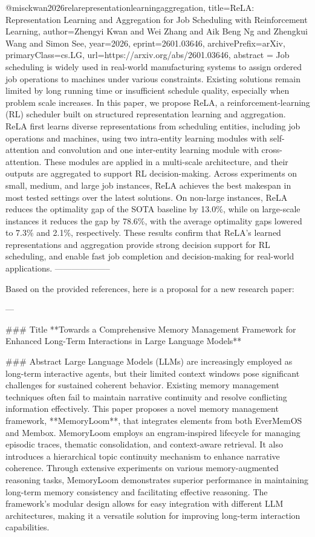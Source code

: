{}@misc{kwan2026relarepresentationlearningaggregation,
      title={ReLA: Representation Learning and Aggregation for Job Scheduling with Reinforcement Learning}, 
      author={Zhengyi Kwan and Wei Zhang and Aik Beng Ng and Zhengkui Wang and Simon See},
      year={2026},
      eprint={2601.03646},
      archivePrefix={arXiv},
      primaryClass={cs.LG},
      url={https://arxiv.org/abs/2601.03646},
      abstract = {Job scheduling is widely used in real-world manufacturing systems to assign ordered job operations to machines under various constraints. Existing solutions remain limited by long running time or insufficient schedule quality, especially when problem scale increases. In this paper, we propose ReLA, a reinforcement-learning (RL) scheduler built on structured representation learning and aggregation. ReLA first learns diverse representations from scheduling entities, including job operations and machines, using two intra-entity learning modules with self-attention and convolution and one inter-entity learning module with cross-attention. These modules are applied in a multi-scale architecture, and their outputs are aggregated to support RL decision-making. Across experiments on small, medium, and large job instances, ReLA achieves the best makespan in most tested settings over the latest solutions. On non-large instances, ReLA reduces the optimality gap of the SOTA baseline by 13.0\%, while on large-scale instances it reduces the gap by 78.6\%, with the average optimality gaps lowered to 7.3\% and 2.1\%, respectively. These results confirm that ReLA's learned representations and aggregation provide strong decision support for RL scheduling, and enable fast job completion and decision-making for real-world applications.}
}
        --------------------
        


Based on the provided references, here is a proposal for a new research paper:

---

### Title
**Towards a Comprehensive Memory Management Framework for Enhanced Long-Term Interactions in Large Language Models**

### Abstract
Large Language Models (LLMs) are increasingly employed as long-term interactive agents, but their limited context windows pose significant challenges for sustained coherent behavior. Existing memory management techniques often fail to maintain narrative continuity and resolve conflicting information effectively. This paper proposes a novel memory management framework, **MemoryLoom**, that integrates elements from both EverMemOS and Membox. MemoryLoom employs an engram-inspired lifecycle for managing episodic traces, thematic consolidation, and context-aware retrieval. It also introduces a hierarchical topic continuity mechanism to enhance narrative coherence. Through extensive experiments on various memory-augmented reasoning tasks, MemoryLoom demonstrates superior performance in maintaining long-term memory consistency and facilitating effective reasoning. The framework's modular design allows for easy integration with different LLM architectures, making it a versatile solution for improving long-term interaction capabilities.

